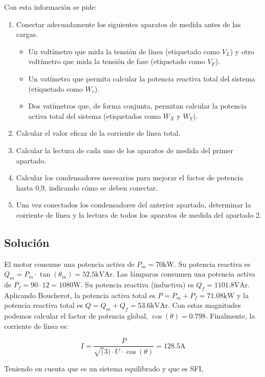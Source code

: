 Con esta información se pide:

\begin{enumerate}
\item Conectar adecuadamente los siguientes aparatos de medida antes
  de las cargas.
  \begin{itemize}
  \item Un voltímetro que mida la tensión de línea (etiquetado como
    $V_L$) y otro voltímetro que mida la tensión de fase (etiquetado
    como $V_F$).
  \item Un vatímetro que permita calcular la potencia reactiva total
    del sistema (etiquetado como $W_r$).
  \item Dos vatímetros que, de forma conjunta, permitan calcular la
    potencia activa total del sistema (etiquetados como $W_X$ y
    $W_Y$).
  \end{itemize}
\item Calcular el valor eficaz de la corriente de línea
  total.
\item Calcular la lectura de cada uno de los aparatos
  de medida del primer apartado.
\item Calcular los condensadores necesarios para
  mejorar el factor de potencia hasta 0,9, indicando cómo se deben
  conectar.
\item Una vez conectados los condensadores del anterior
  apartado, determinar la corriente de línea y la lectura de todos los
  aparatos de medida del apartado 2.
\end{enumerate}

\subsection*{Solución}

El motor consume una potencia activa de $P_m = 70\mathrm{kW}$. Su
potencia reactiva es
$Q_m = P_m \cdot \tan(\theta_m) = 52.5\mathrm{kVAr}$.  Las lámparas
consumen una potencia activa de $P_f = 90 \cdot 12 =
1080\mathrm{W}$. Su potencia reactiva (inductiva) es
$Q_f = 1101.8\mathrm{VAr}$.  Aplicando Boucherot, la potencia activa
total es $P = P_m + P_f = 71.08\mathrm{kW}$ y la potencia reactiva
total es $Q = Q_m + Q_f = 53.6\mathrm{kVAr}$. Con estas magnitudes
podemos calcular el factor de potencia global, $\cos(\theta) =
0.798$. Finalmente, la corriente de línea es:

\[
  I = \frac{P}{\sqrt(3) \cdot U \cdot \cos(\theta)} = 128.5\mathrm{A}
\]


Teniendo en cuenta que es un sistema equilibrado y que es SFI,

